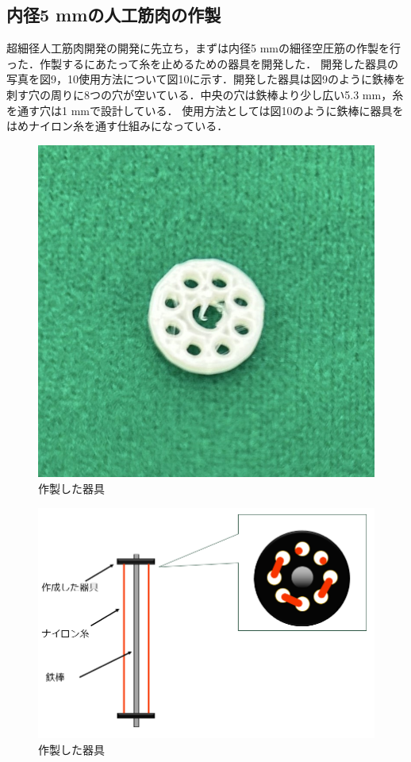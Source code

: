 \newpage
\subsection{内径5 mmの人工筋肉の作製}
超細径人工筋肉開発の開発に先立ち，まずは内径5 mmの細径空圧筋の作製を行った．作製するにあたって糸を止めるための器具を開発した．
開発した器具の写真を図9，10使用方法について図10に示す．開発した器具は図9のように鉄棒を刺す穴の周りに8つの穴が空いている．中央の穴は鉄棒より少し広い5.3 mm，糸を通す穴は1 mmで設計している．
使用方法としては図10のように鉄棒に器具をはめナイロン糸を通す仕組みになっている．
\begin{figure}[!b]
  \centering  %
  \includegraphics[scale=0.3]{pic/kigu2.jpg}
  \caption{作製した器具}
\end{figure}
\begin{figure}[!b]
  \centering  %
  \includegraphics[scale=0.3]{pic/tukau2.PNG}
  \caption{作製した器具}
\end{figure}

